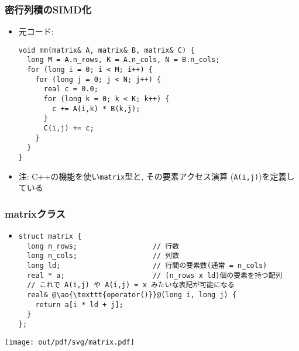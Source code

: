 \documentclass[10pt,dvipdfmx]{beamer}
\newcommand{\ao}[1]{{\color{blue}#1}}
\begin{document}
\begin{frame}[fragile]
\frametitle{密行列積のSIMD化}
\begin{itemize}
\item 元コード:
\begin{lstlisting}
void mm(matrix& A, matrix& B, matrix& C) {
  long M = A.n_rows, K = A.n_cols, N = B.n_cols;
  for (long i = 0; i < M; i++) {
    for (long j = 0; j < N; j++) {
      real c = 0.0;
      for (long k = 0; k < K; k++) {
        c += A(i,k) * B(k,j);
      }
      C(i,j) += c;
    }
  }
}
\end{lstlisting}

\item 注: C++の機能を使い\texttt{matrix}型と,
  その要素アクセス演算 (\texttt{A(i,j)})を定義している
\end{itemize}

\end{frame}

\begin{frame}[fragile]
\frametitle{matrixクラス}
\begin{itemize}
\item[]
\begin{lstlisting}
struct matrix {
  long n_rows;                  // 行数
  long n_cols;                  // 列数
  long ld;                      // 行間の要素数(通常 = n_cols)
  real * a;                     // (n_rows x ld)個の要素を持つ配列
  // これで A(i,j) や A(i,j) = x みたいな表記が可能になる
  real& @\ao{\texttt{operator()}}@(long i, long j) {
    return a[i * ld + j];
  }
};
\end{lstlisting}
\end{itemize}

\begin{center}
  \texttt{[image: out/pdf/svg/matrix.pdf]}
\end{center}

\end{frame}
\end{document}
